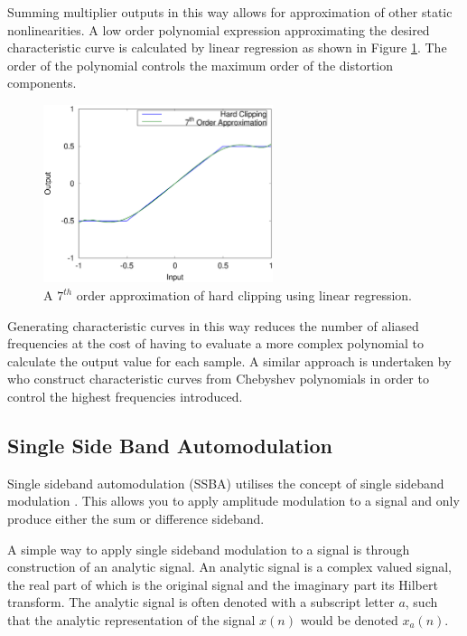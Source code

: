 			Summing multiplier outputs in this way allows for approximation of other static
			nonlinearities. A low order polynomial expression approximating the desired characteristic curve
			is calculated by linear regression as shown in Figure \ref{fig:ClippingApproximation}. The
			order of the polynomial controls the maximum order of the distortion components.

			\begin{figure}[h!]
				\centering
				\includegraphics[width=0.6\textwidth]{chapter3/Images/ClippingApproximation.eps}
				\caption{A $7^{th}$ order approximation of hard clipping using linear regression.}
				\label{fig:ClippingApproximation}
			\end{figure}

			Generating characteristic curves in this way reduces the number of aliased frequencies at the cost
			of having to evaluate a more complex polynomial to calculate the output value for each sample. A
			similar approach is undertaken by \cite{fernandez-cid2001distortion} who construct characteristic
			curves from Chebyshev polynomials in order to control the highest frequencies introduced.


	\subsection{Single Side Band Automodulation}
	\label{sec:Excitation-SSBA}
		Single sideband automodulation (SSBA) utilises the concept of single sideband modulation
		\citep{corinthios2009signals}. This allows you to apply amplitude modulation to a signal and only produce
		either the sum or difference sideband.

		A simple way to apply single sideband modulation to a signal is through construction of an analytic signal.
		An analytic signal is a complex valued signal, the real part of which is the original signal and the
		imaginary part its Hilbert transform. The analytic signal is often denoted with a subscript letter
		$a$, such that the analytic representation of the signal $x(n)$ would be denoted $x_{a}(n)$.

